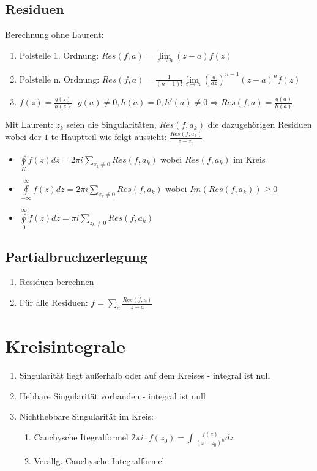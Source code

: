 \documentclass[10pt,a4paper]{article}
\begin{document}
\subsection{Residuen}
Berechnung ohne Laurent:
\begin{enumerate}
\item Polstelle 1. Ordnung: $Res(f,a) = \lim\limits_{z\rightarrow a} (z-a)f(z)$
\item Polstelle n. Ordnung: $Res(f,a) = \frac{1}{(n-1)!} \lim\limits_{z\rightarrow a} \left(\frac{d}{dz}\right)^{n-1} (z-a)^n f(z)$
\item $f(z)=\frac{g(z)}{h(z)} \,\,\,\, g(a) \neq 0, h(a) = 0, h'(a)\neq 0 \Rightarrow Res(f,a)=\frac{g(a)}{h(a)}$
\end{enumerate}

Mit Laurent:
$z_k$ seien die Singularitäten, $Res(f, a_k)$ die dazugehörigen Residuen wobei der $1$-te Hauptteil wie folgt aussieht: $\frac{Res(f, a_k)}{z-z_0}$
\begin{itemize}
\item $\oint\limits_{K} f(z) dz = 2 \pi i \sum\limits_{z_k \neq 0} Res(f, a_k)$ wobei $Res(f, a_k)$ im Kreis
\item $\oint\limits_{-\infty}^{\infty} f(z) dz = 2 \pi i \sum\limits_{z_k \neq 0} Res(f, a_k)$ wobei $Im(Res(f, a_k)) \geq 0$
\item $\oint\limits_{0}^{\infty} f(z) dz = \pi i \sum\limits_{z_k \neq 0} Res(f, a_k)$
\end{itemize}

\subsection{Partialbruchzerlegung}
\begin{enumerate}
\item Residuen berechnen
\item Für alle Residuen: $f = \sum\limits_a \frac{Res(f, a)}{z-a}$
\end{enumerate}

\section{Kreisintegrale}
\begin{enumerate}
 \item Singularität liegt außerhalb oder auf dem Kreises - integral ist null
 \item Hebbare Singularität vorhanden - integral ist null
 \item Nichthebbare Singularität im Kreis:
 \begin{enumerate}
  \item Cauchysche Itegralformel $2 \pi i \cdot f(z_0) = \int \frac{f(z)}{(z-z_0)^n} dz$
  \item Verallg. Cauchysche Integralformel
 \end{enumerate}
\end{enumerate}
\end{document}
